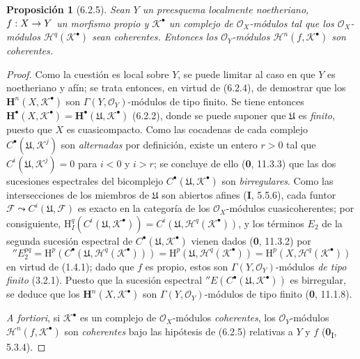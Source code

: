 \documentclass[10pt,oneside,openany]{book}
\theoremstyle{egaenv}\newtheorem*{env}{---}
\theoremstyle{egastatement}
\newtheorem*{proposition}{Proposición}
\theoremstyle{egadescription}
\renewcommand{\to}{\mathchoice{\longrightarrow}{\rightarrow}{\rightarrow}{\rightarrow}}
\begin{document}
\begin{proposition}[6.2.5]
Sean $Y$ un preesquema localmente noetheriano, $f:X\to Y$ un morfismo propio
y $\mathscr K^\bullet$ un complejo de $\mathscr O_X$-módulos tal que los
$\mathscr O_X$-módulos $\mathscr H^q(\mathscr K^\bullet)$ sean coherentes.
Entonces los $\mathscr O_Y$-módulos $\mathscr H^n(f,\mathscr K^\bullet)$ son
coherentes.
\end{proposition}

\begin{proof}
Como la cuestión es local sobre $Y$, se puede limitar al caso en que $Y$ es
noetheriano y afín; se trata entonces, en virtud de (6.2.4), de demostrar que
los $\mathbf H^n(X,\mathscr K^\bullet)$ son
$\Gamma(Y,\mathscr O_Y)$-módulos de tipo finito. Se tiene entonces
$\mathbf H^\bullet(X,\mathscr K^\bullet)=
\mathbf H^\bullet(\mathfrak U,\mathscr K^\bullet)$ (6.2.2), donde se puede
suponer que $\mathfrak U$ es \emph{finito}, puesto que $X$ es cuasicompacto. Como las
cocadenas de cada complejo $C^\bullet(\mathfrak U,\mathscr K^j)$ son
\emph{alternadas} por definición, existe un entero $r>0$ tal que
$C^i(\mathfrak U,\mathscr K^j)=0$ para $i<0$ y $i>r$; se concluye de ello
(\textbf 0, 11.3.3) que las dos sucesiones espectrales del bicomplejo
$C^\bullet(\mathfrak U,\mathscr K^\bullet)$ son \emph{birregulares}. Como las
intersecciones de los miembros de $\mathfrak U$ son abiertos afines
(\textbf I, 5.5.6), cada funtor
$\mathscr F\leadsto C^i(\mathfrak U,\mathscr F)$ es exacto en la categoría de
los $\mathscr O_X$-módulos cuasicoherentes; por consiguiente,
$\mathrm H_I^q(C^i(\mathfrak U,\mathscr K^\bullet))
=C^i(\mathfrak U,\mathscr H^q(\mathscr K^\bullet))$, y los términos
$E_2$ de la segunda sucesión espectral de
$C^\bullet(\mathfrak U,\mathscr K^\bullet)$ vienen dados (\textbf 0, 11.3.2) por
\[
  ''E_2^{pq}
  =\mathrm H^p(C^\bullet(\mathfrak U,\mathscr H^q(\mathscr K^\bullet)))
  =\mathrm H^p(\mathfrak U,\mathscr H^q(\mathscr K^\bullet))
  =\mathrm H^p(X,\mathscr H^q(\mathscr K^\bullet))
\]
en virtud de (1.4.1); dado que $f$ es propio, estos son
$\Gamma(Y,\mathscr O_Y)$-módulos \emph{de tipo finito} (3.2.1). Puesto que la sucesión
espectral $''E(C^\bullet(\mathfrak U,\mathscr K^\bullet))$ es birregular, se
deduce que los $\mathbf H^n(X,\mathscr K^\bullet)$ son
$\Gamma(Y,\mathscr O_Y)$-módulos de tipo finito (\textbf 0, 11.1.8).

\emph{A fortiori}, si $\mathscr K^\bullet$ es un complejo de
$\mathscr O_X$-módulos \emph{coherentes}, los $\mathscr O_Y$-módulos
$\mathscr H^n(f,\mathscr K^\bullet)$ son \emph{coherentes} bajo las hipótesis de
(6.2.5) relativas a $Y$ y $f$ (\textbf{0}\textsubscript{I}, 5.3.4).
\end{proof}
\end{document}
